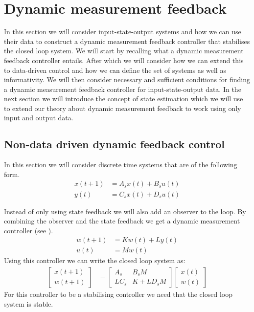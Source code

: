 \section{Dynamic measurement feedback}
In this section we will consider input-state-output systems and how we can use their data to construct a dynamic measurement feedback controller that stabilises the closed loop system. We will start by recalling what a dynamic measurement feedback controller entails. After which we will consider how we can extend this to data-driven control and how we can define the set of systems as well as informativity. We will then consider necessary and sufficient conditions for finding a dynamic measurement feedback controller for input-state-output data. In the next section we will introduce the concept of state estimation which we will use to extend our theory about dynamic measurement feedback to work using only input and output data.

\subsection{Non-data driven dynamic feedback control}
In this section we will consider discrete time systems that are of the following form.
\begin{subequations}\label{outputSys}
	\begin{align} 
		x(t+1) &= A_s x(t) + B_s u(t) \\
		y(t)   &= C_s x(t) + D_s u(t)
	\end{align}
\end{subequations}

Instead of only using state feedback we will also add an observer to the loop. By combining the observer and the state feedback we get a dynamic measurement controller (see \cite[section 3.12]{bookTrentelman}).
\begin{align*}
	w(t+1) &= Kw(t) + Ly(t) \\
	u(t)   &= Mw(t)
\end{align*}
Using this controller we can write the closed loop system as:
\begin{align*}
	\begin{bmatrix}
		x(t+1) \\ w(t+1)
	\end{bmatrix}
	&=
	\begin{bmatrix}
		A_s  & B_s M \\ LC_s & K + LD_s M
	\end{bmatrix}
	\begin{bmatrix}
		x(t) \\ w(t)
	\end{bmatrix}
\end{align*}
For this controller to be a stabilising controller we need that the closed loop system is stable.

